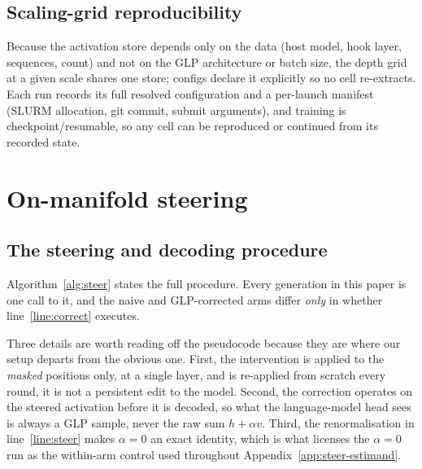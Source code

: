 \documentclass{article}
\begin{document}
\subsection{Scaling-grid reproducibility}
\label{app:repro}

Because the activation store depends only on the data (host model, hook layer, sequences,
count) and not on the GLP architecture or batch size, the depth grid at a given scale
shares one store; configs declare it explicitly so no cell re-extracts. Each run records
its full resolved configuration and a per-launch manifest (SLURM allocation, git commit,
submit arguments), and training is checkpoint/resumable, so any cell can be reproduced or
continued from its recorded state.

\section{On-manifold steering}
\label{app:steering}

\subsection{The steering and decoding procedure}
\label{app:steer-algo}

Algorithm~\ref{alg:steer} states the full procedure. Every generation in this paper is one
call to it, and the naive and GLP-corrected arms differ \emph{only} in whether
line~\ref{line:correct} executes.

Three details are worth reading off the pseudocode because they are where our setup departs
from the obvious one. First, the intervention is applied to the \emph{masked} positions
only, at a single layer, and is re-applied from scratch every round, it is not a
persistent edit to the model. Second, the correction operates on the steered activation
before it is decoded, so what the language-model head sees is always a GLP sample, never the
raw sum $h + \alpha v$. Third, the renormalisation in line~\ref{line:steer} makes
$\alpha{=}0$ an exact identity, which is what licenses the $\alpha{=}0$ run as the
within-arm control used throughout Appendix~\ref{app:steer-estimand}.
\end{document}
